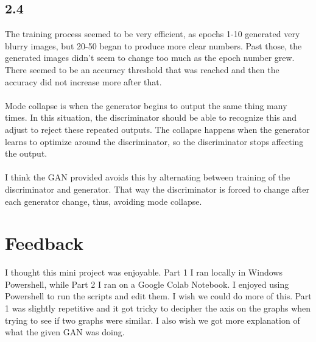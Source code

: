 \documentclass[a4paper,14pt]{extarticle}
\begin{document}
\subsection*{2.4}
The training process seemed to be very efficient, as epochs 1-10 generated very blurry images, but 20-50 began to produce more clear numbers. Past those, the generated images didn't seem to change too much as the epoch number grew. There seemed to be an accuracy threshold that was reached and then the accuracy did not increase more after that.\\\\
Mode collapse is when the generator begins to output the same thing many times. In this situation, the discriminator should be able to recognize this and adjust to reject these repeated outputs. The collapse happens when the generator learns to optimize around the discriminator, so the discriminator stops affecting the output.\\\\
I think the GAN provided avoids this by alternating between training of the discriminator and generator. That way the discriminator is forced to change after each generator change, thus, avoiding mode collapse.
\newpage
\section{Feedback}
I thought this mini project was enjoyable. Part 1 I ran locally in Windows Powershell, while Part 2 I ran on a Google Colab Notebook. I enjoyed using Powershell to run the scripts and edit them. I wish we could do more of this. Part 1 was slightly repetitive and it got tricky to decipher the axis on the graphs when trying to see if two graphs were similar. I also wish we got more explanation of what the given GAN was doing. 
\end{document}
